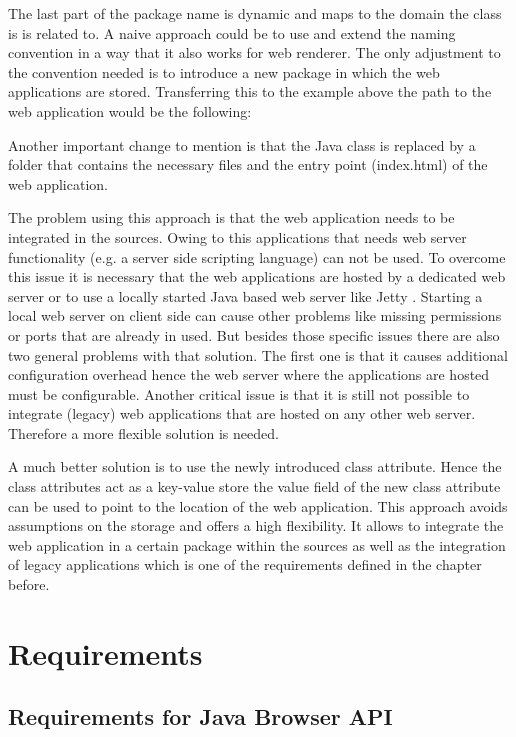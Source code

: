 The last part of the package name is dynamic and maps to the domain the class is is related to. A naive approach could be to use and extend the naming convention in a way that it also works for web renderer.
The only adjustment to the convention needed is to introduce a new package in which the web applications are stored.
Transferring this to the example above the path to the web application would be the following:

\indent \centerline{}

Another important change to mention is that the Java class is replaced by a folder that contains the necessary files and the entry point (index.html) of the web application.

The problem using this approach is that the web application needs to be integrated in the sources.
Owing to this applications that needs web server functionality (e.g.
a server side scripting language) can not be used.
To overcome this issue it is necessary that the web applications are hosted by a dedicated web server or to use a locally started Java based web server like Jetty \autocite{conception:jetty}.
Starting a local web server on client side can cause other problems like missing permissions or ports that are already in used.
But besides those specific issues there are also two general problems with that solution.
The first one is that it causes additional configuration overhead hence the web server where the applications are hosted must be configurable.
Another critical issue is that it is still not possible to integrate (legacy) web applications that are hosted on any other web server.
Therefore a more flexible solution is needed.

A much better solution is to use the newly introduced class attribute.
Hence the class attributes act as a key-value store the value field of the new class attribute can be used to point to the location of the web application.
This approach avoids assumptions on the storage and offers a high flexibility.
It allows to integrate the web application in a certain package within the sources as well as the integration of legacy applications which is one of the requirements defined in the chapter before.

\section{Requirements}\label{chap:requirements}
\subsection{Requirements for Java Browser API}

